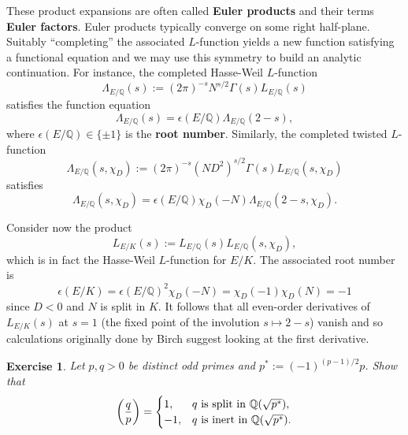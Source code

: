 \documentclass[aspectratio=1610]{beamer}
\newcommand{\Q}{\mathbb{Q}}
\newcommand{\df}{\dfrac}
\newcommand{\eps}{\epsilon}
\newtheorem{exercise}{Exercise}
\begin{document}
\begin{frame}
These product expansions are often called \textbf{Euler products} and their terms \textbf{Euler factors}. Euler products typically converge on some right half-plane. Suitably ``completing'' the associated $L$-function yields a new function satisfying a functional equation and we may use this symmetry to build an analytic continuation. For instance, the completed Hasse-Weil $L$-function 
$$\Lambda_{E/\Q}(s):=(2\pi)^{-s}N^{s/2}\Gamma(s)L_{E/\Q}(s)$$
satisfies the function equation
\begin{equation*}
\Lambda_{E/\Q}(s)=\eps(E/\Q)\Lambda_{E/\Q}(2-s),
\end{equation*}
where $\eps(E/\Q)\in\{\pm1\}$ is the \textbf{root number}. Similarly, the completed twisted $L$-function 
$$\Lambda_{E/\Q}(s,\chi_D):=(2\pi)^{-s}(ND^2)^{s/2}\Gamma(s)L_{E/\Q}(s,\chi_D)$$
satisfies
\begin{equation*}
\Lambda_{E/\Q}(s,\chi_D)=\eps(E/\Q)\chi_D(-N)\Lambda_{E/\Q}(2-s,\chi_D).
\end{equation*}
\end{frame}

\begin{frame}
Consider now the product
$$L_{E/K}(s):=L_{E/\Q}(s)L_{E/\Q}(s,\chi_D),$$
which is in fact the Hasse-Weil $L$-function for $E/K$. The associated root number is 
$$\eps(E/K)=\eps(E/\Q)^2\chi_D(-N)=\chi_D(-1)\chi_D(N)=-1$$
since $D<0$ and $N$ is split in $K$. It follows that all even-order derivatives of $L_{E/K}(s)$ at $s=1$ (the fixed point of the involution $s\mapsto2-s$) vanish and so calculations originally done by Birch suggest looking at the first derivative. %
\begin{exercise}
Let $p,q>0$ be distinct odd primes and $p^*:=(-1)^{(p-1)/2}p$. Show that
\begin{equation*}
\left(\df{q}{p}\right)=
\begin{cases}
1, & q\textup{ is split in }\Q(\sqrt{p^*}), \\
-1, & q\textup{ is inert in }\Q(\sqrt{p^*}).
\end{cases}
\end{equation*}
\end{exercise}
\end{frame}
\end{document}
